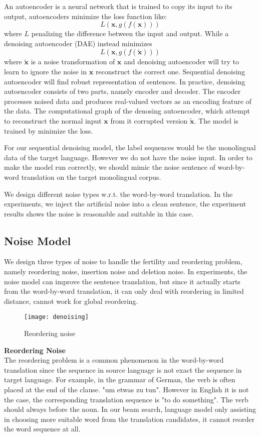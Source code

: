 	An autoencoder is a neural network that is trained to copy its input to its output, autoencoders minimize the loss function like: 
	\[ L(\bm x, g(f(\bm x))) \]
	where ${L}$ penalizing the difference between the input and output.
	While a denoising autoencoder (DAE) instead minimizes
	\[ L(\bm x, g(f( \bm {\tilde  x})))\]
	where ${\bm{\tilde{x}}}$ is a noise transformation of ${\bm x}$ and denoising autoencoder will try to learn to ignore the noise in ${\bm x}$ reconstruct the correct one. Sequential denoising autoencoder will find robust representation of sentences.
	In practice,  denoising autoencoder consists of two parts, namely encoder and decoder. The encoder processes noised data and produces real-valued vectors as an encoding feature of the data. The computational graph of the denosing autoencoder, which attempt to reconstruct the normal input ${\bm x}$ from it corrupted version ${\bm{\tilde{x}}}$. The model is trained by minimize the loss.
	
	For our sequential denoising model, the label sequences would be the monolingual data of the target language. However we do not have the noise input. In order to make the model run correctly, we should mimic the noise sentence of word-by-word translation on the target monolingual corpus.
	
	We design different noise types w.r.t. the word-by-word translation. In the experiments, we inject the artificial noise into a clean sentence, the experiment results shows the noise is reasonable and suitable in this case.
	
\subsection{Noise Model}
We design three types of noise to handle the fertility and reordering problem, namely reordering noise, insertion noise and deletion noise. In experiments, the noise model can improve the sentence translation, but since it actually starts from the word-by-word translation, it can only deal with reordering in limited distance, cannot work for global reordering.\\

	\begin{figure}[h]
	\texttt{[image: denoising]}
	\caption{ Reordering noise}
	\centering
\end{figure}
	\textbf{Reordering Noise}\\

	The reordering problem is a common phenomenon in the word-by-word translation since the sequence in source language is not exact the sequence in target language. 
	For example, in  the grammar of German, the verb is often placed at the end of the clause. 
	"um etwas zu tun". However in English it is not the case, the corresponding translation sequence is "to do something". The verb should always before the noun.
	In our beam search, language model only assisting in choosing  more suitable word from the translation candidates, it cannot reorder the word sequence at all.
	
